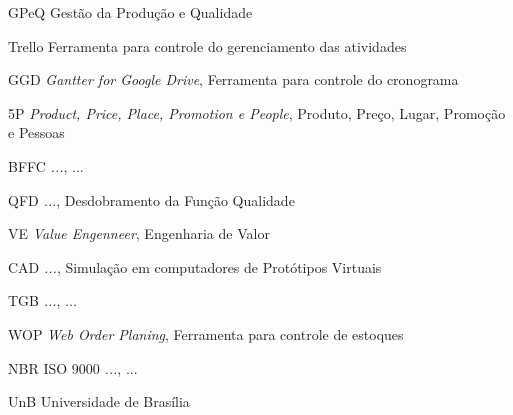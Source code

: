 \begin{siglas}
	\item[GPeQ] Gestão da Produção e Qualidade
	\item[Trello] Ferramenta para controle do gerenciamento das atividades
	\item[GGD] \emph{Gantter for Google Drive},  Ferramenta para controle do cronograma
	\item[5P] \emph{Product, Price, Place, Promotion e People}, Produto, Preço, Lugar, Promoção e Pessoas
	\item[BFFC] \emph{...}, ...
	\item[QFD] \emph{...}, Desdobramento da Função Qualidade
	\item[VE] \emph{Value Engenneer}, Engenharia de Valor
	\item[CAD] \emph{...}, Simulação em computadores de Protótipos Virtuais 
	\item[TGB] \emph{...}, ...
	\item[WOP] \emph{Web Order Planing}, Ferramenta para controle de estoques
	\item[NBR ISO 9000] \emph{...}, ...
	\item[UnB] Universidade de Brasília
	
	
	

\end{siglas}
